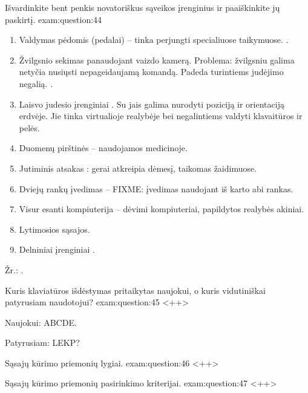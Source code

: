 \begin{question}{%
  Išvardinkite bent penkis novatoriškus sąveikos įrenginius ir
  paaiškinkite jų paskirtį.
  }{exam:question:44}
  \begin{enumerate}
    \item Valdymas pėdomis (pedalai) – tinka perjungti specialiuose
      taikymuose. \cite[43]{skaidres-16}.
    \item Žvilgsnio sekimas  panaudojant vaizdo kamerą.
      Problema: žvilgsniu galima netyčia nusiųsti nepageidaujamą komandą.
      Padeda turintiems judėjimo negalią. \cite[44]{skaidres-16}.
    \item Laisvo judesio įrenginiai . Su jais galima nurodyti poziciją ir orientaciją erdvėje.
      Jie tinka virtualioje realybėje bei negalintiems valdyti klavaitūros
      ir pelės.
    \item Duomenų pirštinės  – naudojamos medicinoje.
    \item Jutiminis atsakas : gerai atkreipia
      dėmesį, taikomas žaidimuose.
    \item Dviejų rankų įvedimas  – FIXME:
      įvedimas naudojant iš karto abi rankas.
    \item Visur esanti kompiuterija  –
      dėvimi kompiuteriai, papildytos realybės akiniai.
    \item Lytimosios  sąsajos.
    \item Delniniai įrenginiai .
  \end{enumerate}
  Žr.: \cite[42]{skaidres-16}.
\end{question}

\begin{question}{%
  Kuris klaviatūros išdėstymas pritaikytas naujokui, o kuris vidutiniškai
  patyrusiam naudotojui?
  }{exam:question:45}
  <++>

  Naujokui: ABCDE.\cite[10]{skaidres-16}

  Patyrusiam: LEKP?

\end{question}

\begin{question}{%
  Sąsajų kūrimo priemonių lygiai.
  }{exam:question:46}
  <++>
\end{question}

\begin{question}{%
  Sąsajų kūrimo priemonių pasirinkimo kriterijai.
  }{exam:question:47}
  <++>
\end{question}
